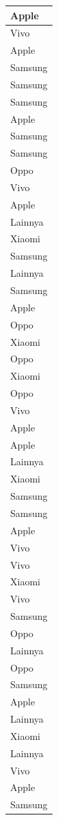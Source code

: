 \documentclass[
  letterpaper,
  DIV=11,
  numbers=noendperiod]{scrartcl}
\begin{document}
\begin{table}
\begin{tabular}[t]{l}
\hline
Apple\\
\hline
Vivo\\
\hline
Apple\\
\hline
Samsung\\
\hline
Samsung\\
\hline
Samsung\\
\hline
Apple\\
\hline
Samsung\\
\hline
Samsung\\
\hline
Oppo\\
\hline
Vivo\\
\hline
Apple\\
\hline
Lainnya\\
\hline
Xiaomi\\
\hline
Samsung\\
\hline
Lainnya\\
\hline
Samsung\\
\hline
Apple\\
\hline
Oppo\\
\hline
Xiaomi\\
\hline
Oppo\\
\hline
Xiaomi\\
\hline
Oppo\\
\hline
Vivo\\
\hline
Apple\\
\hline
Apple\\
\hline
Lainnya\\
\hline
Xiaomi\\
\hline
Samsung\\
\hline
Samsung\\
\hline
Apple\\
\hline
Vivo\\
\hline
Vivo\\
\hline
Xiaomi\\
\hline
Vivo\\
\hline
Samsung\\
\hline
Oppo\\
\hline
Lainnya\\
\hline
Oppo\\
\hline
Samsung\\
\hline
Apple\\
\hline
Lainnya\\
\hline
Xiaomi\\
\hline
Lainnya\\
\hline
Vivo\\
\hline
Apple\\
\hline
Samsung\\

\end{tabular}
\end{table}
\end{document}
